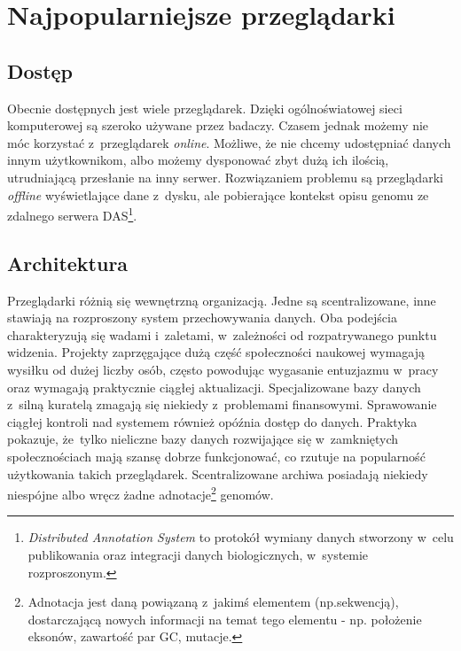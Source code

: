 \documentclass[a4paper,12pt,oneside]{mwrep}  %
\begin{document}
\section{Najpopularniejsze przeglądarki}
\subsection{Dostęp}
Obecnie dostępnych jest wiele przeglądarek. Dzięki ogólnoświatowej sieci komputerowej są szeroko używane przez badaczy. Czasem jednak możemy nie móc korzystać z~przeglądarek \emph{online}. Możliwe, że nie chcemy udostępniać danych innym użytkownikom, albo możemy dysponować zbyt dużą ich ilością, utrudniającą przesłanie na inny serwer. Rozwiązaniem problemu są przeglądarki \emph{offline} wyświetlające dane z~dysku, ale pobierające kontekst opisu genomu ze zdalnego serwera DAS\footnote{\emph{Distributed Annotation System} to protokół wymiany danych stworzony w~celu publikowania oraz integracji danych biologicznych, w~systemie rozproszonym. %
}. %
\subsection{Architektura}
Przeglądarki różnią się wewnętrzną organizacją. Jedne są scentralizowane, inne stawiają na rozproszony system przechowywania danych. Oba podejścia charakteryzują się wadami i~zaletami, w~zależności od rozpatrywanego punktu widzenia. Projekty zaprzęgające dużą część społeczności naukowej wymagają wysiłku od dużej liczby osób, często powodując wygasanie entuzjazmu w~pracy oraz wymagają praktycznie ciągłej aktualizacji. Specjalizowane bazy danych z~silną kuratelą %
zmagają się niekiedy z~problemami finansowymi. Sprawowanie ciągłej kontroli nad systemem również opóźnia dostęp do danych. Praktyka pokazuje, że~tylko nieliczne bazy danych rozwijające się w~zamkniętych społecznościach mają szansę dobrze funkcjonować, co rzutuje na popularność użytkowania takich przeglądarek. Scentralizowane archiwa %
posiadają niekiedy niespójne albo wręcz żadne adnotacje\footnote{Adnotacja jest daną powiązaną z~jakimś elementem (np.sekwencją), dostarczającą nowych informacji na temat tego elementu - np. położenie eksonów, zawartość par GC, mutacje. %
} genomów. %
\end{document}
